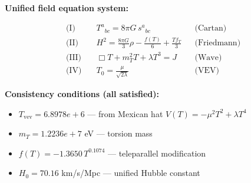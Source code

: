 
\textbf{Unified field equation system:}

\begin{align}
  \text{(I)} \quad & T^a{}_{bc} = 8\pi G \, s^a{}_{bc} && \text{(Cartan)} \\
  \text{(II)} \quad & H^2 = \frac{8\pi G}{3}\rho - \frac{f(T)}{6} + \frac{Tf_T}{3} && \text{(Friedmann)} \\
  \text{(III)} \quad & \Box T + m_T^2 T + \lambda T^3 = J && \text{(Wave)} \\
  \text{(IV)} \quad & T_0 = \frac{\mu}{\sqrt{2\lambda}} && \text{(VEV)}
\end{align}

\textbf{Consistency conditions (all satisfied):}
\begin{itemize}
  \item $T_{\text{vev}} = 6.8978e+6$ — from Mexican hat $V(T) = -\mu^2 T^2 + \lambda T^4$
  \item $m_T = 1.2236e+7$ eV — torsion mass
  \item $f(T) = -1.3650 \, T^{0.1074}$ — teleparallel modification
  \item $H_0 = 70.16$ km/s/Mpc — unified Hubble constant
\end{itemize}